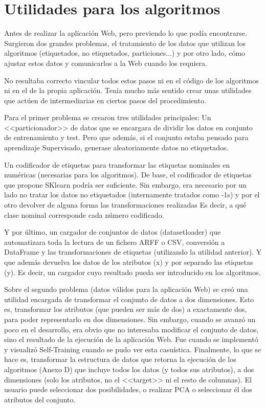 \section{Utilidades para los algoritmos}

Antes de realizar la aplicación Web, pero previendo lo que podía encontrarse.
Surgieron dos grandes problemas, el tratamiento de los datos que utilizan los
algoritmos (etiquetados, no etiquetados, particiones...) y por otro lado, cómo
ajustar estos datos y comunicarlos a la Web cuando los requiera.

No resultaba correcto vincular todos estos pasos ni en el código de los
algoritmos ni en el de la propia aplicación. Tenía mucho más sentido crear unas
utilidades que actúen de intermediarias en ciertos pasos del procedimiento.

Para el primer problema se crearon tres utilidades principales: Un <<particionador>>
de datos que se encargara de dividir los datos en conjunto de entrenamiento
y test. Pero que además, si el conjunto estaba pensado para aprendizaje
Supervisado, generase aleatoriamente datos no etiquetados.

Un codificador de etiquetas para transformar las etiquetas nominales en
numéricas (necesarias para los algoritmos). De base, el codificador de etiquetas
que propone SKlearn podría ser suficiente. Sin embargo, era necesario por un
lado no tratar los datos no etiquetados (internamente tratados como -1s) y por
el otro devolver de alguna forma las transformaciones realizadas Es decir, a qué
clase nominal corresponde cada número codificado.

Y por último, un cargador de conjuntos de datos (datasetloader) que automatizara
toda la lectura de un fichero ARFF o CSV, conversión a DataFrame y las
transformaciones de etiquetas (utilizando la utilidad anterior). Y que además
devuelva los datos de los atributos (x) y por separado las etiquetas (y). Es
decir, un cargador cuyo resultado pueda ser introducido en los algoritmos. 

Sobre el segundo problema (datos válidos para la aplicación Web) se creó una
utilidad encargada de transformar el conjunto de datos a dos dimensiones. Esto
es, transformar los atributos (que pueden ser más de dos) a exactamente dos,
para poder representarlo en dos dimensiones. Sin embargo, cuando se avanzó un
poco en el desarrollo, era obvio que no interesaba modificar el conjunto de
datos, sino el resultado de la ejecución de la aplicación Web. Fue cuando se
implementó y visualizó Self-Training cuando se pudo ver esta casuística.
Finalmente, lo que se hace es, transformar la estructura de datos que retorna la
ejecución de los algoritmos (Anexo D) que incluye todos los datos (y todos sus
atributos), a dos dimensiones (solo los atributos, no el <<target>> ni el resto
de columnas). El usuario puede seleccionar dos posibilidades, o realizar PCA o
seleccionar él dos atributos del conjunto.

